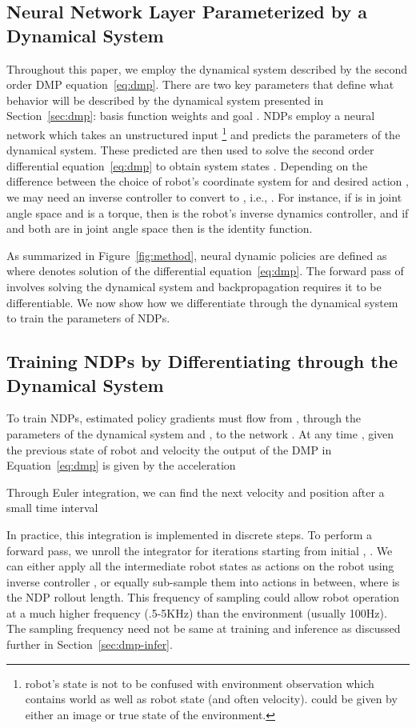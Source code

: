 \documentclass{article}
\newcommand{\our}{NDP\xspace}
\newcommand{\ours}{NDPs\xspace}
\begin{document}
\subsection{Neural Network Layer Parameterized by a Dynamical System}
Throughout this paper, we employ the dynamical system described by the second order DMP equation~\eqref{eq:dmp}. There are two key parameters that define what behavior will be described by the dynamical system presented in Section~\ref{sec:dmp}: basis function weights  and goal . NDPs employ a neural network  which takes an unstructured input \footnote{robot's state  is not to be confused with environment observation  which contains world as well as robot state (and often velocity).  could be given by either an image or true state of the environment.} and predicts the parameters  of the dynamical system. These predicted  are then used to solve the second order differential equation~\eqref{eq:dmp} to obtain system states . Depending on the difference between the choice of robot's coordinate system for  and desired action , we may need an inverse controller  to convert  to , i.e., . For instance, if  is in joint angle space and  is a torque, then  is the robot's inverse dynamics controller, and if  and  both are in joint angle space then  is the identity function.

As summarized in Figure~\ref{fig:method}, neural dynamic policies are defined as  where  denotes solution of the differential equation~\eqref{eq:dmp}. The forward pass of  involves solving the dynamical system and backpropagation requires it to be differentiable. We now show how we differentiate through the dynamical system to train the parameters  of \ours.

\subsection{Training NDPs by Differentiating through the Dynamical System}
\label{sec:dmp-train}
To train NDPs, estimated policy gradients must flow from , through the parameters of the dynamical system  and , to the network . At any time , given the previous state of robot  and velocity  the output of the DMP in Equation~\eqref{eq:dmp} is given by the acceleration

Through Euler integration, we can find the next velocity and position after a small time interval 

In practice, this integration is implemented in  discrete steps. To perform a forward pass, we unroll the integrator for  iterations starting from initial , .
We can either apply all the  intermediate robot states  as actions on the robot using inverse controller , or equally sub-sample them into  actions in between, where  is the \our rollout length. This frequency of sampling could allow robot operation at a much higher frequency (.5-5KHz) than the environment (usually 100Hz). The sampling frequency need not be same at training and inference as discussed further in Section~\ref{sec:dmp-infer}.
\end{document}
